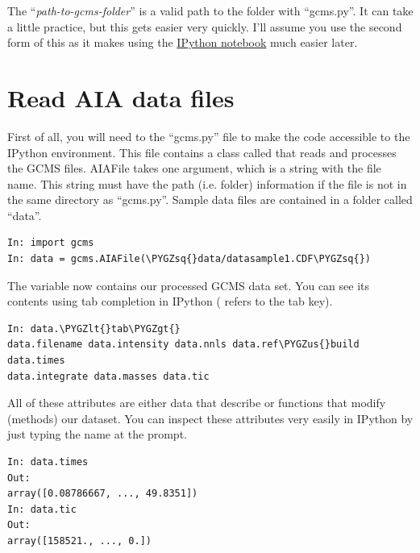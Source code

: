 \documentclass[letterpaper,10pt,english]{sphinxmanual}
\def\PYGZus{\char`\_}
\def\PYGZlt{\char`\<}
\def\PYGZgt{\char`\>}
\def\PYGZsq{\char`\'}
\begin{document}
The ``\emph{path-to-gcms-folder}'' is a valid path to the folder with ``gcms.py''. It
can take a little practice, but this gets easier very quickly. I'll assume you
use the second form of this as it makes using the \href{http://ipython.org/notebook.html}{IPython notebook} much
easier later.


\section{Read AIA data files}
\label{basics:ipython-notebook}\label{basics:read-aia-data-files}
First of all, you will need to  the ``gcms.py'' file to make the code
accessible to the IPython environment. This file contains a class called
 that reads and processes the GCMS files. AIAFile takes one
argument, which is a string with the file name. This string must have the path
(i.e.  folder) information if the file is not in the same directory as
``gcms.py''.  Sample data files are contained in a folder called ``data''.

\begin{Verbatim}[commandchars=\\\{\}]
In: import gcms
In: data = gcms.AIAFile(\PYGZsq{}data/datasample1.CDF\PYGZsq{})
\end{Verbatim}

The variable  now contains our processed GCMS data set. You can see
its contents using tab completion in IPython ( refers to the tab
key).

\begin{Verbatim}[commandchars=\\\{\}]
In: data.\PYGZlt{}tab\PYGZgt{}
data.filename data.intensity data.nnls data.ref\PYGZus{}build data.times
data.integrate data.masses data.tic
\end{Verbatim}

All of these attributes are either data that describe or functions that modify
(methods) our dataset. You can inspect these attributes very easily in
IPython by just typing the name at the prompt.

\begin{Verbatim}[commandchars=\\\{\}]
In: data.times
Out:
array([0.08786667, ..., 49.8351])
In: data.tic
Out:
array([158521., ..., 0.])
\end{Verbatim}
\end{document}
